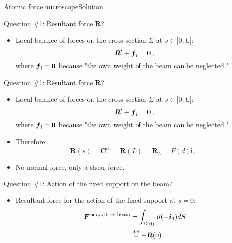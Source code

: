 \documentclass{beamer}
\newcommand{\id}{d}
\renewcommand{\ij}{i}
\newcommand{\iv}{{\boldsymbol\ij}}
\newcommand{\fj}{f}
\newcommand{\Fj}{F}
\newcommand{\fv}{{\boldsymbol\fj}}
\newcommand{\Fv}{{\boldsymbol\Fj}}
\newcommand{\stress}{\mbox{$\hspace{0.3em}\rotatebox[x=0pt,y=0.2pt]{90}{\rule{0.017\linewidth}{0.4pt}}\hspace{-0.25em}\upsigma$}}
\newcommand{\Fresj}{R}
\newcommand{\Fres}{{\boldsymbol\Fresj}}
\newcommand{\bzero}{{\bf 0}}
\begin{document}
\begin{frame}{Atomic force microscope}{Solution}

\begin{overprint}

\vskip-20pt
\begin{exampleblock}{Question \#1: Resultant force $\Fres$?}
\begin{itemize}
\item Local balance of forces on the cross-section $\Sigma$ at $s\in]0,L[$:
\begin{displaymath}
\Fres'+\fv_l=\bzero\,,
\end{displaymath}
where $\fv_l=\bzero$ because "the own weight of the beam can be neglected."
\end{itemize}
\end{exampleblock}

\vskip-20pt
\begin{exampleblock}{Question \#1: Resultant force $\Fres$?}
\begin{itemize}
\item Local balance of forces on the cross-section $\Sigma$ at $s\in]0,L[$:
\begin{displaymath}
\Fres'+\fv_l=\bzero\,,
\end{displaymath}
where $\fv_l=\bzero$ because "the own weight of the beam can be neglected."
\item Therefore:
\begin{displaymath}
\Fres(s)={\boldsymbol C}^\text{st}=\Fres(L)=\Fres_L=F(d)\iv_1\,.
\end{displaymath}
\item No normal force, only a shear force.
\end{itemize}
\end{exampleblock}

\vskip-20pt
\begin{exampleblock}{Question \#1: Action of the fixed support on the beam?}
\begin{itemize}
\item Resultant force for the action of the fixed support at $s=0$:
\begin{displaymath}
\begin{split}
\Fv^\text{support $\to$ beam} &=\int_{\Sigma(0)}\stress(-\iv_3) \id S \\
&\overset{\text{def}}{=}-\Fres(0)
\end{split}
\end{displaymath}
\end{itemize}
\end{exampleblock}


\end{overprint}
\end{frame}
\end{document}
